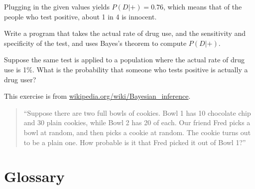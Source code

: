 \documentclass[12pt]{book}
\begin{document}
Plugging in the given values yields $P(D|+) = 0.76$, which means
that of the people who test positive, about 1 in 4 is innocent. 

\begin{ex}

Write a program that takes the actual rate of drug use, and the
sensitivity and specificity of the test, and uses Bayes's theorem
to compute $P(D|+)$.

Suppose the same test is applied to a population where the actual
rate of drug use is 1\%.  What is the probability that someone
who tests positive is actually a drug user?

\end{ex}


\begin{ex}

This exercise is from \url{wikipedia.org/wiki/Bayesian_inference}.

\begin{quote}

``Suppose there are two full bowls of cookies. Bowl 1 has 10 chocolate
  chip and 30 plain cookies, while Bowl 2 has 20 of each. Our friend
  Fred picks a bowl at random, and then picks a cookie at random. The
  cookie turns out to be a plain one. How probable is it that Fred
  picked it out of Bowl 1?''

\end{quote}

\end{ex}






\section{Glossary}
\end{document}
